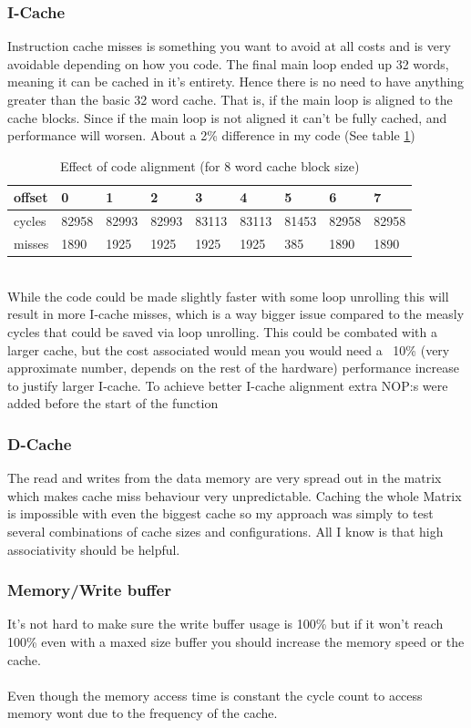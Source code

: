 \documentclass{article}
\begin{document}
\subsubsection{I-Cache}
Instruction cache misses is something you want to avoid at all costs and is very avoidable depending on how you code. The final main loop ended up 32 words, meaning it can be cached in it's entirety. Hence there is no need to have anything greater than the basic 32 word cache. That is, if the main loop is aligned to the cache blocks. Since if the main loop is not aligned it can't be fully cached, and performance will worsen. About a 2\% difference in my code (See table \ref{offest_table})
\begin{table}[h]
	\centering
	\begin{tabular}{|l|l|l|l|l|l|l|l|l|} \hline
        offset & 0 &	1 &	2 &	3 &	4 &	5 &	6 &	7 \\\hline
        cycles & 82958 &	82993 &	82993 &	83113 &	83113 &	81453 &	82958 &	82958 \\\hline
        misses & 1890 &	1925 &	1925 &	1925 &	1925 &	385 &	1890 &	1890 \\\hline
	\end{tabular}
	\caption{Effect of code alignment (for 8 word cache block size)}
	\label{offest_table}
\end{table}
\\
While the code could be made slightly faster with some loop unrolling this will result in more I-cache misses, which is a way bigger issue compared to the measly cycles that could be saved via loop unrolling. This could be combated with a larger cache, but the cost associated would mean you would need a ~10\% (very approximate number, depends on the rest of the hardware) performance increase to justify larger I-cache. To achieve better I-cache alignment extra NOP:s were added before the start of the function
\subsubsection{D-Cache}
The read and writes from the data memory are very spread out in the matrix which makes cache miss behaviour very unpredictable. Caching the whole Matrix is impossible with even the biggest cache so my approach was simply to test several combinations of cache sizes and configurations. All I know is that high associativity should be helpful.
\subsubsection{Memory/Write buffer}
It's not hard to make sure the write buffer usage is 100\% but if it won't reach 100\% even with a maxed size buffer you should increase the memory speed or the cache.
\\\\
Even though the memory access time is constant the cycle count to access memory wont due to the frequency of the cache.
\newpage
\end{document}
